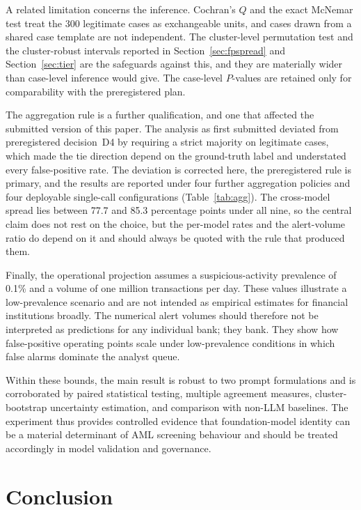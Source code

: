 \documentclass[pdflatex,sn-basic,Numbered]{sn-jnl}
\newcommand{\HLtext}[1]{\texthl{#1}}
\newcommand{\HLdel}[1]{\textcolor{HLink}{\sout{#1}}}
\renewcommand{\HLtext}[1]{#1}\renewcommand{\HLdel}[1]{#1}%
\begin{document}
\HLtext{A related limitation concerns the inference. Cochran's} $Q$ \HLtext{and the exact McNemar test treat the 300 legitimate cases as exchangeable units, and cases drawn from a shared case template are not independent. The cluster-level permutation test and the cluster-robust intervals reported in} Section~\ref{sec:fpspread} \HLtext{and} Section~\ref{sec:tier} \HLtext{are the safeguards against this, and they are materially wider than case-level inference would give. The case-level} $P$\HLtext{-values are retained only for comparability with the preregistered plan.}

\HLtext{The aggregation rule is a further qualification, and one that affected the submitted version of this paper. The analysis as first submitted deviated from preregistered} decision~D4 \HLtext{by requiring a strict majority on legitimate cases, which made the tie direction depend on the ground-truth label and understated every false-positive rate. The deviation is corrected here, the preregistered rule is primary, and the results are reported under four further aggregation policies and four deployable single-call configurations} (Table~\ref{tab:agg}\HLtext{). The cross-model spread lies between 77.7 and 85.3 percentage points under all nine, so the central claim does not rest on the choice, but the per-model rates and the alert-volume ratio do depend on it and should always be quoted with the rule that produced them.}

Finally, the operational projection assumes a suspicious-activity prevalence of 0.1\% and a volume of one million transactions per day. These values illustrate a low-prevalence scenario and are not intended as empirical estimates for financial institutions broadly. The numerical alert volumes should therefore not be interpreted as predictions for any individual \HLdel{bank; they} \HLtext{bank. They} show how false-positive operating points scale under low-prevalence conditions in which false alarms dominate the analyst queue.

Within these bounds, the main result is robust to two prompt formulations and is corroborated by paired statistical testing, multiple agreement measures, cluster-bootstrap uncertainty estimation, and comparison with non-LLM baselines. The experiment thus provides controlled evidence that foundation-model identity can be a material determinant of AML screening behaviour and should be treated accordingly in model validation and governance.

\section{Conclusion}\label{sec:conclusion}
\end{document}
